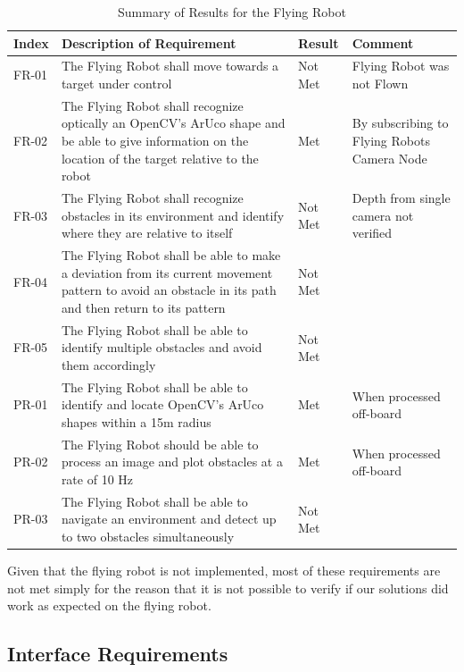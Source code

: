 \documentclass{article}[12]
\begin{document}
	\begin{table}[H]
  \small
		\begin{tabular}{p{2cm} p{8cm} p{2cm} p{3cm}}
			\hline
			{\textbf{Index}} & {\textbf{Description of Requirement}} & {\textbf{Result}} & {\textbf{Comment}} \\ \hline
FR-01 & The Flying Robot shall move towards a target under control & Not Met & Flying Robot was not Flown \\
FR-02 & The Flying Robot shall recognize optically an OpenCV's ArUco shape and be able to give information on the location of the target relative to the robot & Met & By subscribing to Flying Robots Camera Node\\
FR-03 & The Flying Robot shall recognize obstacles in its environment and identify where they are relative to itself & Not Met & Depth from single camera not verified\\
FR-04 & The Flying Robot shall be able to make a deviation from its current movement pattern to avoid an obstacle in its path and then return to its pattern & Not Met &  \\
FR-05 & The Flying Robot shall be able to identify multiple obstacles and avoid them accordingly & Not Met  &\\
PR-01 & The Flying Robot shall be able to identify and locate OpenCV's ArUco shapes within a 15m radius & Met & When processed off-board\\
PR-02 & The Flying Robot should be able to process an image and plot obstacles at a rate of 10 Hz & Met & When processed off-board \\
PR-03 & The Flying Robot shall be able to navigate an environment and detect up to two obstacles simultaneously & Not Met & \\ \hline
		\end{tabular}
		\caption{Summary of Results for the Flying Robot}
		\label{table:uavresults}
 \end{table}

Given that the flying robot is not implemented, most of these requirements are not met simply for the reason that it is not possible to verify if our solutions did work as expected on the flying robot.

 \subsection{Interface Requirements}
\end{document}
